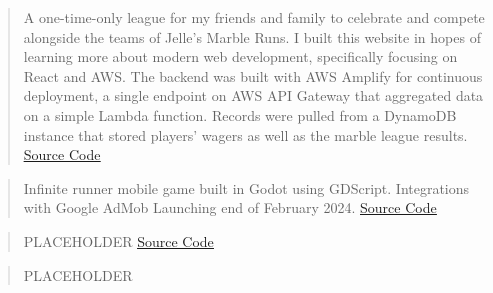 

\begin{cvparagraph}

\begin{quote}
\thinspace A one-time-only league for my friends and family to celebrate and compete alongside the teams of Jelle's Marble Runs. I built this website in hopes of learning 
more about modern web development, specifically focusing on React and AWS. The backend was built with AWS Amplify for continuous deployment, a single endpoint on AWS API Gateway
that aggregated data on a simple Lambda function. Records were pulled from a DynamoDB instance that stored players' wagers as well as the marble league results.
\newline\href{https://github.com/johnsoe/thg_marbles}{\underline {Source Code}}
\end{quote}

\begin{quote}
\thinspace Infinite runner mobile game built in Godot using GDScript. Integrations with Google AdMob Launching end of February 2024.
\newline\href{https://github.com/johnsoe/Track-Four}{\underline {Source Code}}
\end{quote}

\begin{quote}
\thinspace PLACEHOLDER
\newline\href{https://github.com/johnsoe/advent_kotlin}{\underline {Source Code}}
\end{quote}

\begin{quote}
\thinspace PLACEHOLDER
\end{quote}



\end{cvparagraph}
